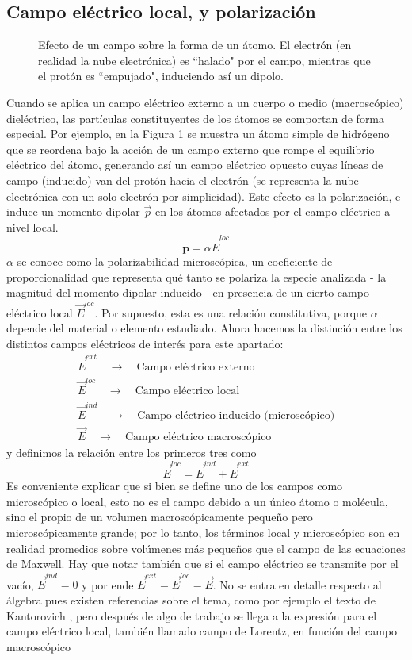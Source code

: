 \documentclass[12pt, oneside, numbers, spanish]{ezthesis}
\numberwithin{equation}{section}
\begin{document}
\subsection{Campo eléctrico local, y polarización}
\begin{figure}[H]
\centering

\caption{Efecto de un campo sobre la forma de un átomo. El electrón (en realidad la nube electrónica) es ``halado" por el campo, mientras que el protón es ``empujado", induciendo así un dipolo.}
\end{figure}
Cuando se aplica un campo eléctrico externo a un cuerpo o medio (macroscópico) dieléctrico, las partículas constituyentes de los átomos se comportan de forma especial. Por ejemplo, en la Figura 1 se muestra un átomo simple de hidrógeno que se reordena bajo la acción de un campo externo que rompe el equilibrio eléctrico del átomo, generando así un campo eléctrico opuesto cuyas líneas de campo (inducido) van del protón hacia el electrón (se representa la nube electrónica con un solo electrón por simplicidad). Este efecto es la polarización, e induce un momento dipolar $\vec{p}$ en los átomos afectados por el campo eléctrico a nivel local.
\begin{equation}
\mathbf{p} = \alpha\vec{E}^{loc}
\end{equation}
$\alpha$ se conoce como la polarizabilidad microscópica, un coeficiente de proporcionalidad que representa qué tanto se polariza la especie analizada - la magnitud del momento dipolar inducido - en presencia de un cierto campo eléctrico local $\vec{E}^{loc}$. Por supuesto, esta es una relación constitutiva, porque $\alpha$ depende del material o elemento estudiado. Ahora hacemos la distinción entre los distintos campos eléctricos de interés para este apartado:
\begin{gather*}
\vec{E}^{ext} \quad \longrightarrow \quad \text{Campo eléctrico externo}\\
\vec{E}^{loc} \quad \longrightarrow \quad \text{Campo eléctrico local}\\
\vec{E}^{ind} \quad \longrightarrow \quad \text{Campo eléctrico inducido (microscópico)}\\
\vec{E} \quad \longrightarrow \quad \text{Campo eléctrico macroscópico}
\end{gather*}
y definimos la relación entre los primeros tres como
\begin{equation}
\vec{E}^{loc} = \vec{E}^{ind} + \vec{E}^{ext}
\end{equation}
Es conveniente explicar que si bien se define uno de los campos como microscópico o local, esto no es el campo debido a un único átomo o molécula, sino el propio de un volumen macroscópicamente pequeño pero microscópicamente grande; por lo tanto, los términos local y microscópico son en realidad promedios sobre volúmenes más pequeños que el campo de las ecuaciones de Maxwell. Hay que notar también que si el campo eléctrico se transmite por el vacío, $\vec{E}^{ind} = 0$ y por ende $\vec{E}^{ext} = \vec{E}^{loc} = \vec{E}$. No se entra en detalle respecto al álgebra pues existen referencias sobre el tema, como por ejemplo el texto de Kantorovich \cite{Kantorovich}, pero después de algo de trabajo se llega a la expresión para el campo eléctrico local, también llamado campo de Lorentz, en función del campo macroscópico
\end{document}
